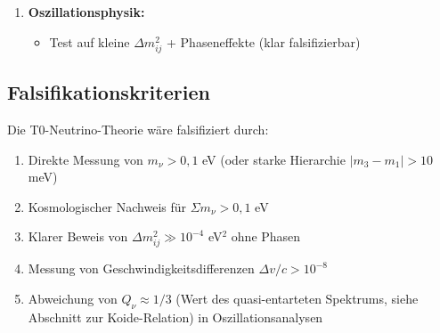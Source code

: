 \begin{experimental}
\begin{enumerate}
			\item \textbf{Oszillationsphysik:}
			\begin{itemize}
				\item Test auf kleine $\Delta m^2_{ij}$ + Phaseneffekte (klar falsifizierbar)
			\end{itemize}
		\end{enumerate}
	\end{experimental}
	
	\subsection{Falsifikationskriterien}
	
	Die T0-Neutrino-Theorie wäre falsifiziert durch:
	\begin{enumerate}
		\item Direkte Messung von $m_\nu > 0,1$ eV (oder starke Hierarchie $|m_3 - m_1| > 10$ meV)
		\item Kosmologischer Nachweis für $\Sigma m_\nu > 0,1$ eV
		\item Klarer Beweis von $\Delta m^2_{ij} \gg 10^{-4}$ eV$^2$ ohne Phasen
		\item Messung von Geschwindigkeitsdifferenzen $\Delta v/c > 10^{-8}$
		\item Abweichung von $Q_\nu \approx 1/3$ (Wert des quasi-entarteten Spektrums, siehe Abschnitt zur Koide-Relation) in Oszillationsanalysen
	\end{enumerate}
	

